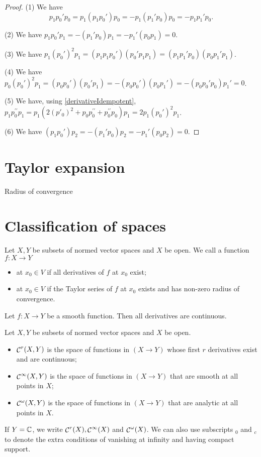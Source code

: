 \begin{proof}
(1) We have
\[ p_1p_0'p_0 = p_1(p_1p_0')p_0 = -p_1(p_1'p_0)p_0 = -p_1p_1'p_0. \]

(2) We have $p_1p_0'p_1 = -(p_1'p_0)p_1 = -p_1'(p_0p_1) = 0$.

(3) We have $p_1(p_0')^2p_1 = (p_1p_1p_0')(p_0'p_1p_1) = (p_1p_1'p_0)(p_0p_1'p_1)$.

(4) We have $p_0(p_0')^2p_1 = (p_0p_0')(p_0'p_1) = -(p_0p_0')(p_0p_1') = -(p_0p_0'p_0)p_1' = 0$.

(5) We have, using \ref{derivativeIdempotent}, $p_1p^{\prime\prime}_0p_1 = p_1(2(p'_0)^2 + p_0p_0^{\prime\prime} + p_0^{\prime\prime}p_0)p_1 = 2p_1(p_0')^2p_1$.

(6) We have $(p_1p_0')p_2 = - (p_1'p_0)p_2 = - p_1'(p_0p_2) = 0$.
\end{proof}

\section{Taylor expansion}
Radius of convergence

\section{Classification of spaces}
\begin{definition}
Let $X,Y$ be subsets of normed vector spaces and $X$ be open. We call a function $f: X\to Y$
\begin{itemize}
\item {} at $x_0\in V$ if all derivatives of $f$ at $x_0$ exist;
\item {} at $x_0\in V$ if the Taylor series of $f$ at $x_0$ exists and has non-zero radius of convergence.
\end{itemize}
\end{definition}
\begin{lemma}
Let $f: X\to Y$ be a smooth function. Then all derivatives are continuous.
\end{lemma}

\begin{definition}
Let $X,Y$ be subsets of normed vector spaces and $X$ be open.
\begin{itemize}
\item $\mathop{\mathcal{C}}^r(X,Y)$ is the space of functions in $(X \to Y)$ whose first $r$ derivatives exist and are continuous;
\item $\mathop{\mathcal{C}}^\infty(X,Y)$ is the space of functions in $(X \to Y)$ that are smooth at all points in $X$;
\item $\mathop{\mathcal{C}}^\omega(X,Y)$ is the space of functions in $(X \to Y)$ that are analytic at all points in $X$.
\end{itemize}
If $Y = \mathbb{C}$, we write $\mathop{\mathcal{C}}^r(X), \mathop{\mathcal{C}}^\infty(X)$ and $\mathop{\mathcal{C}}^\omega(X)$. We can also use subscripts $_0$ and $_c$ to denote the extra conditions of vanishing at infinity and having compact support.
\end{definition}



